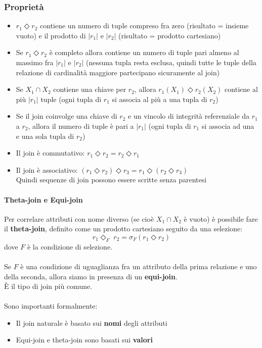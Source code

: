 \documentclass[../main.tex]{subfiles}
\begin{document}
	\subsubsection{Proprietà}
	\begin{itemize}
		\item $r_1 \Diamond r_2$ contiene un numero di tuple compreso fra zero (risultato = insieme vuoto) e il prodotto di $|r_1|$ e $|r_2|$ (risultato = prodotto cartesiano)
		\item Se $r_1 \Diamond r_2$ è completo allora contiene un numero di tuple pari almeno al massimo fra $|r_1|$ e $|r_2|$ (nessuna tupla resta esclusa, quindi tutte le tuple della relazione di cardinalità maggiore partecipano sicuramente al join)
		\item Se $X_1 \cap X_2$ contiene una chiave per $r_2$, allora $r_1(X_1) \Diamond r_2(X_2)$ contiene al più $|r_1|$ tuple (ogni tupla di $r_1$ si associa al più a una tupla di $r_2$)
		\item Se il join coinvolge una chiave di $r_2$ e un vincolo di integrità referenziale da $r_1$ a $r_2$, allora il numero di tuple è pari a $|r_1|$ (ogni tupla di $r_1$ si associa ad una e una sola tupla di $r_2$)
		\item Il join è commutativo: $r_1 \Diamond r_2 = r_2 \Diamond r_1$
		\item Il join è associativo: $(r_1 \Diamond r_2) \Diamond r_3 = r_1 \Diamond (r_2 \Diamond r_3)$\\
		Quindi sequenze di join possono essere scritte senza parentesi
	\end{itemize}
	\paragraph{Theta-join e Equi-join}
	Per correlare attributi con nome diverso (se cioè $X_1 \cap X_2$ è vuoto) è possibile fare il \textbf{theta-join}, definito come un prodotto cartesiano seguito da una selezione:
	\[r_1 \Diamond_F \; r_2 = \sigma_F (r_1 \Diamond r_2)\]
	dove $F$ è la condizione di selezione.\\\\
	Se $F$ è una condizione di uguaglianza fra un attributo della prima relazione e uno della seconda, allora siamo in presenza di un \textbf{equi-join}.\\
	È il tipo di join più comune.\\\\
	Sono importanti formalmente: 
	\begin{itemize}
		\item Il join naturale è basato sui \textbf{nomi} degli attributi
		\item Equi-join e theta-join sono basati sui \textbf{valori}
	\end{itemize}
\end{document}
